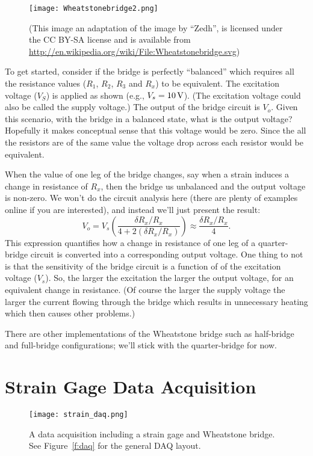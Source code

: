 \begin{figure}[hbt!]
\centerline{
{\texttt{[image: Wheatstonebridge2.png]}}}
\caption{  (This image an adaptation of the image by ``Zedh'', is licensed under the CC BY-SA license and is available from \url{http://en.wikipedia.org/wiki/File:Wheatstonebridge.svg}) }
\label{f:bridge}
\end{figure}

To get started, consider if the bridge is perfectly ``balanced'' which requires all the resistance values ($R_1$, $R_2$, $R_3$ and $R_x$) to be equivalent.  The \gls{excitation voltage} ($V_S$) is applied as shown (e.g., $V_s=\unit[10]{V}$).  (The excitation voltage could also be called the supply voltage.) The output of the bridge circuit is $V_o$.  Given this scenario, with the bridge in a balanced state, what is the output voltage?  Hopefully it makes conceptual sense that this voltage would be zero.  Since the all the resistors are of the same value the voltage drop across each resistor would be equivalent.

When the value of one leg of the bridge changes, say when a strain induces a change in resistance of $R_x$, then the bridge us unbalanced and the output voltage is non-zero.  We won't do the circuit analysis here (there are plenty of examples online if you are interested), and instead we'll just present the result:
\begin{equation}\label{e:bridge}
V_o = V_s \left( \frac{\delta R_x/R_x}{4+2(\delta R_x/R_x)} \right) \approx \frac{\delta R_x/R_x}{4}.
\end{equation}
This expression quantifies how a change in resistance of one leg of a quarter-bridge circuit is converted into a corresponding output voltage.  One thing to not is that the sensitivity of the bridge circuit is a function of of the excitation voltage ($V_s$).  So, the larger the excitation the larger the output voltage, for an equivalent change in resistance.  (Of course the larger the supply voltage the larger the current flowing through the bridge which results in unnecessary heating which then causes other problems.)

There are other implementations of the Wheatstone bridge such as half-bridge and full-bridge configurations; we'll stick with the quarter-bridge for now.

\section{Strain Gage Data Acquisition}
\begin{figure}[hbt!]
\centering
\texttt{[image: strain\_daq.png]}
\caption{A data acquisition including a strain gage and Wheatstone bridge.  See Figure~\ref{f:daq} for the general DAQ layout.}
\label{f:straindaq}
\end{figure}

